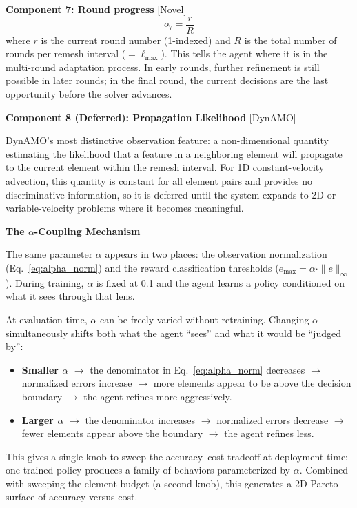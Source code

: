 \documentclass[11pt]{article}
\newcommand{\provdynamo}{\textcolor{dynamo}{\textsf{[DynAMO]}}}
\newcommand{\provnovel}{\textcolor{novel}{\textsf{[Novel]}}}
\begin{document}
\vspace{0.3cm}
\noindent\textbf{Component 7: Round progress} \provnovel
\[
o_7 = \frac{r}{R}
\]
where $r$ is the current round number (1-indexed) and $R$ is the total number of rounds per remesh interval ($= \ell_{\max}$). This tells the agent where it is in the multi-round adaptation process. In early rounds, further refinement is still possible in later rounds; in the final round, the current decisions are the last opportunity before the solver advances.

\vspace{0.5cm}
\noindent\textbf{Component 8 (Deferred): Propagation Likelihood} \provdynamo

\vspace{0.15cm}
\noindent DynAMO's most distinctive observation feature: a non-dimensional quantity estimating the likelihood that a feature in a neighboring element will propagate to the current element within the remesh interval. For 1D constant-velocity advection, this quantity is constant for all element pairs and provides no discriminative information, so it is deferred until the system expands to 2D or variable-velocity problems where it becomes meaningful.

\vspace{0.5cm}
\noindent\textbf{The $\alpha$-Coupling Mechanism}

\vspace{0.15cm}
\noindent The same parameter $\alpha$ appears in two places: the observation normalization (Eq.~\ref{eq:alpha_norm}) and the reward classification thresholds ($e_{\max} = \alpha \cdot \|e\|_\infty$). During training, $\alpha$ is fixed at 0.1 and the agent learns a policy conditioned on what it sees through that lens. 

At evaluation time, $\alpha$ can be freely varied without retraining. Changing $\alpha$ simultaneously shifts both what the agent ``sees'' and what it would be ``judged by'':
\begin{itemize}[leftmargin=1.5em, itemsep=3pt]
    \item \textbf{Smaller $\alpha$} $\to$ the denominator in Eq.~\ref{eq:alpha_norm} decreases $\to$ normalized errors increase $\to$ more elements appear to be above the decision boundary $\to$ the agent refines more aggressively.
    \item \textbf{Larger $\alpha$} $\to$ the denominator increases $\to$ normalized errors decrease $\to$ fewer elements appear above the boundary $\to$ the agent refines less.
\end{itemize}
This gives a single knob to sweep the accuracy--cost tradeoff at deployment time: one trained policy produces a family of behaviors parameterized by $\alpha$. Combined with sweeping the element budget (a second knob), this generates a 2D Pareto surface of accuracy versus cost.
\end{document}
